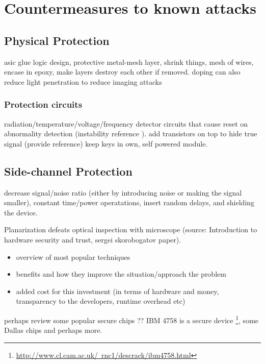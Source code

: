 \section{Countermeasures to known attacks}
\label{sec:defenses}
\subsection{Physical Protection}
asic glue logic design, protective metal-mesh layer, shrink things, mesh of wires, encase in epoxy, make layers destroy each other if removed. doping can also reduce light penetration to reduce imaging attacks 
\subsubsection{Protection circuits}
radiation/temperature/voltage/frequency detector circuits that cause reset on abnormality detection (instability reference \citep{anderson:cautionary_note}). add transistors on top to hide true signal (provide reference)
 keep keys in own, self powered module.
\subsection{Side-channel Protection}
decrease signal/noise ratio (either by introducing noise or making the signal smaller), constant time/power operatations, insert random delays\citep{sergei:thesis}, \citep{kocher:DPA} and shielding the device.

Planarization defeats optical inspection with microscope (source: Introduction to hardware security and trust, sergei skorobogatov paper).\\
	\begin{itemize}
	\item overview of most popular techniques \\
	\item benefits and how they improve the situation/approach the problem
	\item added cost for this investment (in terms of hardware and money, transparency to the developers, runtime overhead etc)\\
	\end{itemize}
	
	perhaps review some popular secure chips ?? IBM 4758 is a secure device \footnote{\href{http://www.cl.cam.ac.uk/~rnc1/descrack/ibm4758.html}{http://www.cl.cam.ac.uk/~rnc1/descrack/ibm4758.html}}, some Dallas chips and perhaps more.